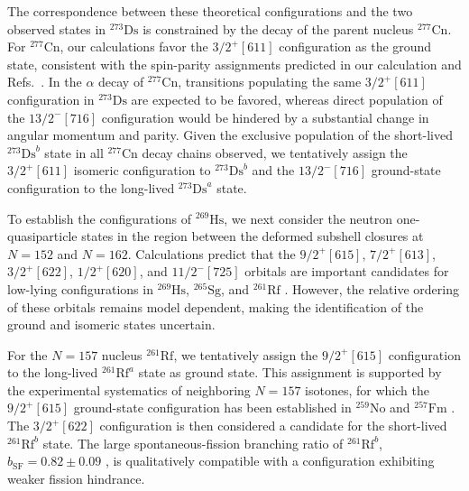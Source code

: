 \documentclass[final,5p,times,twocolumn,number,sort&compress]{elsarticle}
\begin{document}
The correspondence between these theoretical configurations and the two observed states in $^{273}\mathrm{Ds}$ is constrained by the decay of the parent nucleus $^{277}\mathrm{Cn}$. For $^{277}\mathrm{Cn}$, our calculations favor the $3/2^+[611]$ configuration as the ground state, consistent with the spin-parity assignments predicted in our calculation and Refs.~\cite{moller2019NuclearPropertiesAstrophysical,jachimowicz2025CandidatesThreequasiparticleIsomers}. In the $\alpha$ decay of $^{277}\mathrm{Cn}$, transitions populating the same $3/2^+[611]$ configuration in $^{273}\mathrm{Ds}$ are expected to be favored, whereas direct population of the $13/2^-[716]$ configuration would be hindered by a substantial change in angular momentum and parity. Given the exclusive population of the short-lived $^{273}\mathrm{Ds}^{b}$ state in all $^{277}\mathrm{Cn}$ decay chains observed, we tentatively assign the $3/2^+[611]$ isomeric configuration to $^{273}\mathrm{Ds}^{b}$ and the $13/2^-[716]$ ground-state configuration to the long-lived $^{273}\mathrm{Ds}^{a}$ state.


To establish the configurations of $^{269}\mathrm{Hs}$, we next consider the neutron one-quasiparticle states in the region between the deformed subshell closures at $N=152$ and $N=162$. Calculations predict that the $9/2^+[615]$, $7/2^+[613]$, $3/2^+[622]$, $1/2^+[620]$, and $11/2^-[725]$ orbitals are important candidates for low-lying configurations in $^{269}\mathrm{Hs}$, $^{265}\mathrm{Sg}$, and $^{261}\mathrm{Rf}$ \cite{Parkhomenko2005,cwiok1994ShellStructureHeaviest,nazarewiczTheoreticalDescriptionSuperheavy}. However, the relative ordering of these orbitals remains model dependent, making the identification of the ground and isomeric states uncertain.

For the $N=157$ nucleus $^{261}\mathrm{Rf}$, we tentatively assign the $9/2^+[615]$ configuration to the long-lived $^{261}\mathrm{Rf}^{a}$ state as ground state. This assignment is supported by the experimental systematics of neighboring $N=157$ isotones, for which the $9/2^+[615]$ ground-state configuration has been established in $^{259}\mathrm{No}$ and $^{257}\mathrm{Fm}$ \cite{asai2013GroundstateConfiguration157}. The $3/2^+[622]$ configuration is then considered a candidate for the short-lived $^{261}\mathrm{Rf}^{b}$ state. The large spontaneous-fission branching ratio of $^{261}\mathrm{Rf}^{b}$, $b_{\mathrm{SF}}=0.82\pm0.09$ \cite{habaProduction265Sg2012}, is qualitatively compatible with a configuration exhibiting weaker fission hindrance.%
\end{document}
